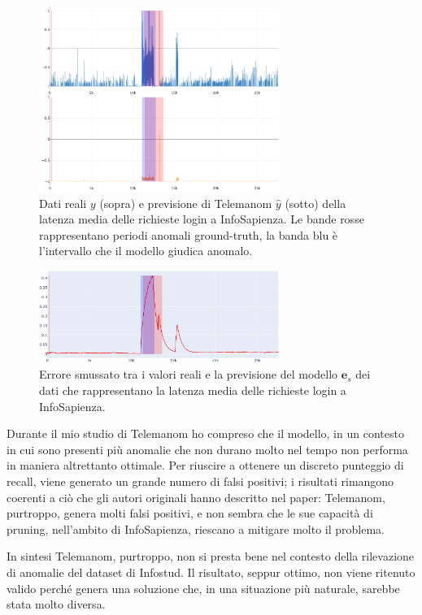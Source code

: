 \begin{figure}[H]
    \centering
    \includegraphics[width=0.7\textwidth]{./input/chapters/models/figs/telemanom-ys-comparison.png}
    \caption{Dati reali $y$ (sopra) e previsione di Telemanom $\hat{y}$ (sotto) della latenza media delle richieste
    login a InfoSapienza. Le bande rosse rappresentano periodi anomali ground-truth, la banda blu è l'intervallo 
    che il modello giudica anomalo.}
    \label{fig:telemanom-ys-comparison}
\end{figure}

\begin{figure}[H]
    \centering
    \includegraphics[width=0.7\textwidth]{./input/chapters/models/figs/telemanom-e_s.png}
    \caption{Errore smussato tra i valori reali e la previsione del modello $\mathbf{e}_s$ dei dati che rappresentano la 
    latenza media delle richieste login a InfoSapienza.}
    \label{fig:telemanom-e_s}
\end{figure}


Durante il mio studio di Telemanom ho compreso che il modello, in un contesto in cui sono presenti più anomalie 
che non durano molto nel tempo non performa in maniera altrettanto ottimale. Per riuscire a ottenere un 
discreto punteggio di recall, viene generato un grande numero di falsi positivi; i risultati rimangono coerenti 
a ciò che gli autori originali hanno descritto nel paper: Telemanom, purtroppo, genera molti falsi positivi, e non sembra che 
le sue capacità di pruning, nell'ambito di InfoSapienza, riescano a mitigare molto il problema.
    
In sintesi Telemanom, purtroppo, non si presta bene nel contesto della rilevazione di anomalie 
del dataset di Infostud. Il risultato, seppur ottimo, non viene ritenuto valido perché genera una soluzione che, 
in una situazione più naturale, sarebbe stata molto diversa.